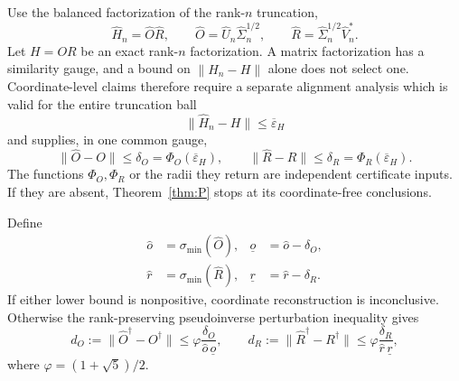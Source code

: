 \documentclass[aps,prl,reprint,superscriptaddress,nofootinbib]{revtex4-2}
\newcommand{\eps}{\varepsilon}
\begin{document}
Use the balanced factorization of the rank-$n$ truncation,
\begin{equation}
 \widehat H_n=\widehat O\widehat R,
 \qquad
 \widehat O=\widehat U_n\widehat\Sigma_n^{1/2},
 \qquad
 \widehat R=\widehat\Sigma_n^{1/2}\widehat V_n^*.
 \label{eq:balanced-truncated-factorization}
\end{equation}
Let $H=OR$ be an exact rank-$n$ factorization.  A matrix factorization has a similarity gauge, and a bound on $\|\widehat H_n-H\|$ alone does not select one.  Coordinate-level claims therefore require a separate alignment analysis which is valid for the entire truncation ball
\begin{equation}
 \|\widehat H_n-H\|\le\overline\eps_H
\end{equation}
and supplies, in one common gauge,
\begin{equation}
 \|\widehat O-O\|\le\delta_O=\Phi_O(\overline\eps_H),
 \qquad
 \|\widehat R-R\|\le\delta_R=\Phi_R(\overline\eps_H).
 \label{eq:factor-errors}
\end{equation}
The functions $\Phi_O,\Phi_R$ or the radii they return are independent certificate inputs.  If they are absent, Theorem~\ref{thm:P} stops at its coordinate-free conclusions.

Define
\begin{align}
 \widehat o&=\sigma_{\min}(\widehat O),&
 \underline o&=\widehat o-\delta_O,\nonumber\\
 \widehat r&=\sigma_{\min}(\widehat R),&
 \underline r&=\widehat r-\delta_R.
 \label{eq:factor-gaps}
\end{align}
If either lower bound is nonpositive, coordinate reconstruction is inconclusive.  Otherwise the rank-preserving pseudoinverse perturbation inequality gives
\begin{equation}
 d_O:=\|\widehat O^\dagger-O^\dagger\|
 \le\varphi\frac{\delta_O}{\widehat o\,\underline o},
 \qquad
 d_R:=\|\widehat R^\dagger-R^\dagger\|
 \le\varphi\frac{\delta_R}{\widehat r\,\underline r},
 \label{eq:pinv-bounds}
\end{equation}
where $\varphi=(1+\sqrt5)/2$.
\end{document}
